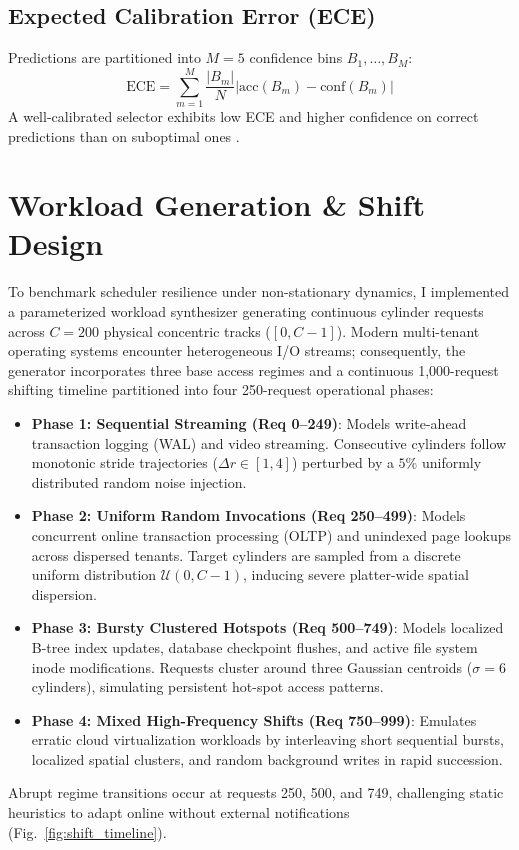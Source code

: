 \documentclass[conference,10pt]{IEEEtran}
\begin{document}
\subsection{Expected Calibration Error (ECE)}
Predictions are partitioned into $M = 5$ confidence bins $B_1, \dots, B_M$:
\begin{equation}
    \text{ECE} = \sum_{m=1}^M \frac{|B_m|}{N} \left| \text{acc}(B_m) - \text{conf}(B_m) \right|
    \label{eq:ece}
\end{equation}
A well-calibrated selector exhibits low ECE and higher confidence on correct predictions than on suboptimal ones \cite{guo2017calibration}.

\section{Workload Generation \& Shift Design}
To benchmark scheduler resilience under non-stationary dynamics, I implemented a parameterized workload synthesizer generating continuous cylinder requests across $C = 200$ physical concentric tracks ($[0, C-1]$). Modern multi-tenant operating systems encounter heterogeneous I/O streams; consequently, the generator incorporates three base access regimes and a continuous 1,000-request shifting timeline partitioned into four 250-request operational phases:
\begin{itemize}
    \item \textbf{Phase 1: Sequential Streaming (Req 0--249)}: Models write-ahead transaction logging (WAL) and video streaming. Consecutive cylinders follow monotonic stride trajectories ($\Delta r \in [1, 4]$) perturbed by a $5\%$ uniformly distributed random noise injection.
    \item \textbf{Phase 2: Uniform Random Invocations (Req 250--499)}: Models concurrent online transaction processing (OLTP) and unindexed page lookups across dispersed tenants. Target cylinders are sampled from a discrete uniform distribution $\mathcal{U}(0, C-1)$, inducing severe platter-wide spatial dispersion.
    \item \textbf{Phase 3: Bursty Clustered Hotspots (Req 500--749)}: Models localized B-tree index updates, database checkpoint flushes, and active file system inode modifications. Requests cluster around three Gaussian centroids ($\sigma = 6$ cylinders), simulating persistent hot-spot access patterns.
    \item \textbf{Phase 4: Mixed High-Frequency Shifts (Req 750--999)}: Emulates erratic cloud virtualization workloads by interleaving short sequential bursts, localized spatial clusters, and random background writes in rapid succession.
\end{itemize}
Abrupt regime transitions occur at requests 250, 500, and 749, challenging static heuristics to adapt online without external notifications (Fig.~\ref{fig:shift_timeline}).
\end{document}
